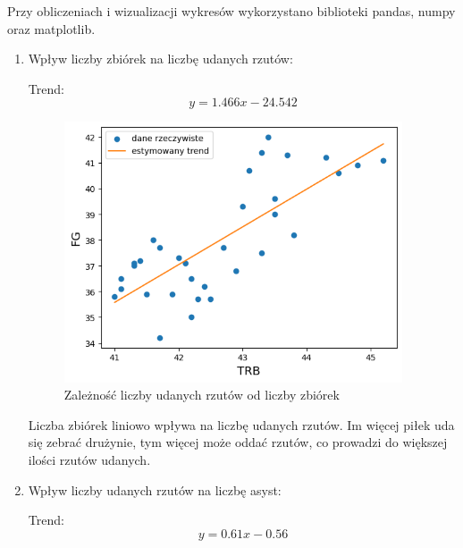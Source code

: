 \documentclass{article}
\begin{document}
    Przy obliczeniach i wizualizacji wykresów wykorzystano biblioteki pandas, numpy oraz matplotlib.
    
    \begin{enumerate}
        \item Wpływ liczby zbiórek na liczbę udanych rzutów:
        
        
        Trend:\begin{equation} y = 1.466x - 24.542 \end{equation}
        
            \begin{figure}[H]
                \centering
                \includegraphics[width=10cm]{wykres_zaleznosci_FG_od_TRB.png}
                \caption{Zależność liczby udanych rzutów od liczby zbiórek}
                \label{fig:wykres_zaleznosci_FG_od_TRB}
            \end{figure}

        Liczba zbiórek liniowo wpływa na liczbę udanych rzutów. Im więcej piłek uda się zebrać drużynie, tym więcej może oddać rzutów, co prowadzi do większej ilości rzutów udanych.    
 \newpage            
        \item Wpływ liczby udanych rzutów na liczbę asyst:
        
        
        Trend:\begin{equation} y = 0.61x - 0.56 \end{equation}
        

\end{enumerate}
\end{document}
